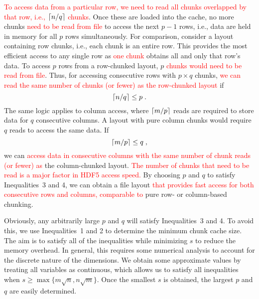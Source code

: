 \documentclass{article}
\newcommand{\revised}[1]{\textcolor{red}{#1}}
\begin{document}
\revised{To access data from a particular row, we need to read all chunks overlapped by that row, i.e., $\left \lceil n/q \right \rceil$ chunks}.
Once these are loaded into the cache, no more chunks \revised{need to be read from file} to access the next $p-1$ rows, i.e., data are held in memory for all $p$ rows simultaneously.
For comparison, consider a layout containing row chunks, i.e., each chunk is an entire row.
This provides the most efficient access to any single row as \revised{one chunk} obtains all and only that row's data.
To access $p$ rows from a row-chunked layout, $p$ \revised{chunks would need to be read from file}.
Thus, for accessing consecutive rows with $p \times q$ chunks, \revised{we can read the same number of chunks (or fewer) as the row-chunked layout} if 
\begin{equation}
\left \lceil n/q \right \rceil \le p \;.
\end{equation}
The same logic applies to column access, where $\left \lceil m/p \right \rceil$ reads are required to store data for $q$ consecutive columns.
A layout with pure column chunks would require $q$ reads to access the same data.
If 
\begin{equation}
\left \lceil m/p \right \rceil \le q \;,
\end{equation}
we can \revised{access data in consecutive columns with the same number of chunk reads (or fewer) as} the column-chunked layout. 
\revised{The number of chunks that need to be read is a major factor in HDF5 access speed.}
By choosing $p$ and $q$ to satisfy Inequalities~3 and 4, we can obtain a file layout \revised{that provides fast access for both consecutive rows and columns, comparable to} pure row- or column-based chunking.

Obviously, any arbitrarily large $p$ and $q$ will satisfy Inequalities~3 and 4.
To avoid this, we use Inequalities~1 and 2 to determine the minimum chunk cache size.
The aim is to satisfy all of the inequalities while minimizing $s$ to reduce the memory overhead.
In general, this requires some numerical analysis to account for the discrete nature of the dimensions.
We obtain some approximate values by treating all variables as continuous, which allows us to satisfy all inequalities when $s \ge \max\{m\sqrt{n}, n\sqrt{m}\}$.
Once the smallest $s$ is obtained, the largest $p$ and $q$ are easily determined.


\end{document}

